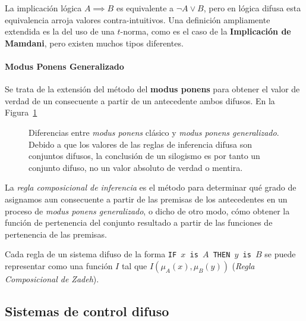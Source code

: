 La implicación lógica $A \implies B$ es equivalente a $\lnot A \lor B$, pero en lógica difusa esta equivalencia arroja valores contra-intuitivos. Una definición ampliamente extendida es la del uso de una $t$-norma, como es el caso de la \textbf{Implicación de Mamdani}, pero existen muchos tipos diferentes.

\paragraph{Modus Ponens Generalizado}

Se trata de la extensión del método del \textbf{modus ponens} para obtener el valor de verdad de un consecuente a partir de un antecedente ambos difusos. En la Figura~\ref{fig:modus-ponens-classic-vs-generalized}

\begin{figure}[!b]
	\centering
	\caption[Diferencias entre \textit{modus ponens} clásico y \textit{modus ponens generalizado}.]{Diferencias entre \textit{modus ponens} clásico y \textit{modus ponens generalizado}. Debido a que los valores de las reglas de inferencia difusa son conjuntos difusos, la conclusión de un silogismo es por tanto un conjunto difuso, no un valor absoluto de verdad o mentira.}
	\label{fig:modus-ponens-classic-vs-generalized}
\end{figure}

La \textit{regla composicional de inferencia} es el método para determinar qué grado de asignamos aun consecuente a partir de las premisas de los antecedentes en un proceso de \textit{modus ponens generalizado}, o dicho de otro modo, cómo obtener la función de pertenencia del conjunto resultado a partir de las funciones de pertenencia de las premisas.

Cada regla de un sistema difuso de la forma \texttt{IF $x$ is $A$ THEN $y$ is $B$} se puede representar como una función $I$ tal que $I(\mu_A(x), \mu_B(y))$ (\textit{Regla Composicional de Zadeh}).

\subsection{Sistemas de control difuso}
\label{ss:fcs}

